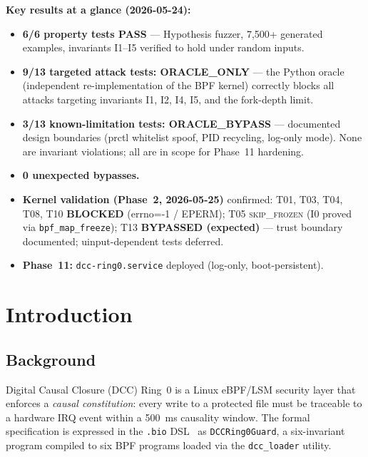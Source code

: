\documentclass[11pt,a4paper]{article}
\theoremstyle{definition}
\begin{document}
\begin{resultbox}
\textbf{Key results at a glance (2026-05-24):}
\begin{itemize}[noitemsep]
  \item \textbf{6/6 property tests PASS} — Hypothesis fuzzer, 7,500+ generated examples,
        invariants I1–I5 verified to hold under random inputs.
  \item \textbf{9/13 targeted attack tests: ORACLE\_ONLY} — the Python oracle
        (independent re-implementation of the BPF kernel) correctly blocks all
        attacks targeting invariants I1, I2, I4, I5, and the fork-depth limit.
  \item \textbf{3/13 known-limitation tests: ORACLE\_BYPASS} — documented design
        boundaries (prctl whitelist spoof, PID recycling, log-only mode). None
        are invariant violations; all are in scope for Phase~11 hardening.
  \item \textbf{0 unexpected bypasses.}
  \item \textbf{Kernel validation (Phase~2, 2026-05-25)} confirmed:
        T01, T03, T04, T08, T10 \textbf{BLOCKED} (errno=-1 / EPERM); T05 \textsc{skip\_frozen}
        (I0 proved via \texttt{bpf\_map\_freeze}); T13 \textbf{BYPASSED (expected)} —
        trust boundary documented; uinput-dependent tests deferred.
  \item \textbf{Phase~11:} \texttt{dcc-ring0.service} deployed (log-only, boot-persistent).
\end{itemize}
\end{resultbox}

\tableofcontents
\newpage

\section{Introduction}

\subsection{Background}

Digital Causal Closure (DCC) Ring~0 is a Linux eBPF/LSM security layer that
enforces a \emph{causal constitution}: every write to a protected file must be
traceable to a hardware IRQ event within a 500~ms causality window. The formal
specification is expressed in the \texttt{.bio} DSL~\cite{bioos-paper} as
\texttt{DCCRing0Guard}, a six-invariant program compiled to six BPF programs
loaded via the \texttt{dcc\_loader} utility.
\end{document}
